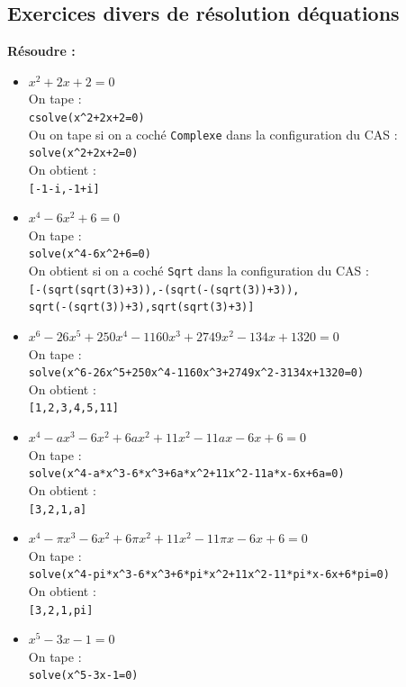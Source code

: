 \documentclass[a4paper,11pt]{book}
\begin{document}
\subsection{Exercices divers de r\'esolution d\'equations}
{\bf R\'esoudre :}
\begin{itemize}
\item $x^2+2x+2=0$\\
On tape :\\
{\tt csolve(x\verb|^|2+2x+2=0)}\\
Ou on tape si on a coch\'e {\tt Complexe} dans la configuration du CAS :\\
{\tt solve(x\verb|^|2+2x+2=0)}\\
On obtient :\\
{\tt [-1-i,-1+i]}
\item $x^4-6x^2+6=0$\\
On tape :\\
{\tt solve(x\verb|^|4-6x\verb|^|2+6=0)}\\
On obtient si on a coch\'e {\tt Sqrt} dans la configuration du CAS :\\
{\tt [-(sqrt(sqrt(3)+3)),-(sqrt(-(sqrt(3))+3)),\\
sqrt(-(sqrt(3))+3),sqrt(sqrt(3)+3)]}
\item $x^6-26x^5+250x^4-1160x^3+2749x^2-134x+1320=0$\\
On tape :\\
{\tt solve(x\verb|^|6-26x\verb|^|5+250x\verb|^|4-1160x\verb|^|3+2749x\verb|^|2-3134x+1320=0)}\\
On obtient :\\
{\tt [1,2,3,4,5,11]}
\item $x^4-ax^3-6x^2+6ax^2+11x^2-11ax-6x+6=0$\\
On tape :\\
{\tt  solve(x\verb|^|4-a*x\verb|^|3-6*x\verb|^|3+6a*x\verb|^|2+11x\verb|^|2-11a*x-6x+6a=0)}\\
On obtient :\\
{\tt [3,2,1,a]}
\item $x^4-\pi x^3-6x^2+6\pi x^2+11x^2-11\pi x-6x+6=0$\\
On tape :\\
{\tt solve(x\verb|^|4-pi*x\verb|^|3-6*x\verb|^|3+6*pi*x\verb|^|2+11x\verb|^|2-11*pi*x-6x+6*pi=0)}\\
On obtient :\\
{\tt [3,2,1,pi]}
\item $x^5-3x-1=0$\\
On tape :\\
{\tt solve(x\verb|^|5-3x-1=0)}\\

\end{itemize}
\end{document}

